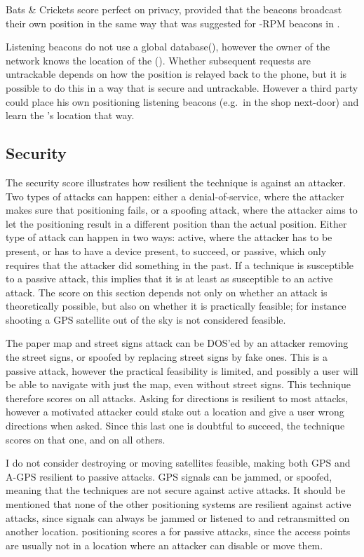 Bats \& Crickets score perfect on privacy, provided that the beacons broadcast their own position in the same way that was suggested for \aBRP-RPM beacons in .

Listening beacons do not use a global database(\yes), however the owner of the network knows the location of the \device (\no).
Whether subsequent requests are untrackable depends on how the position is relayed back to the phone, but it is possible to do this in a way that is secure  and untrackable.
However a third party could place his own positioning listening beacons (e.g.\ in the shop next-door) and learn the \device's location that way.

\subsection{Security}
The security score illustrates how resilient the technique is against an attacker.
Two types of attacks can happen: either a denial-of-service, where the attacker makes sure that positioning fails, or a spoofing attack, where the attacker aims to let the positioning result in a different position than the actual position.
Either type of attack can happen in two ways: active, where the attacker has to be present, or has to have a device present, to succeed, or passive, which only requires that the attacker did something in the past.
If a technique is susceptible to a passive attack, this implies that it is at least as susceptible to an active attack.
The score on this section depends not only on whether an attack is theoretically possible, but also on whether it is practically feasible; for instance shooting a GPS satellite out of the sky is not considered feasible.

The paper map and street signs attack can be DOS'ed by an attacker removing the street signs, or spoofed by replacing street signs by fake ones.
This is a passive attack, however the practical feasibility is limited, and possibly a user will be able to navigate with just the map, even without street signs.
This technique therefore scores \maybe on all attacks.
Asking for directions is resilient to most attacks, however a motivated attacker could stake out a location and give a user wrong directions when asked.
Since this last one is doubtful to succeed, the technique scores \maybe on that one, and \yes on all others.

I do not consider destroying or moving satellites feasible, making both GPS and A-GPS resilient to passive attacks.
GPS signals can be jammed\citep{grant2009gps}, or spoofed\citep{tippenhauer2011requirements}, meaning that the techniques are not secure against active attacks.
It should be mentioned that none of the other positioning systems are resilient against active attacks, since signals can always be jammed or listened to and retransmitted on another location.
\Wifi positioning scores a \maybe for passive attacks, since the \wifi access points are usually not in a location where an attacker can disable or move them.

